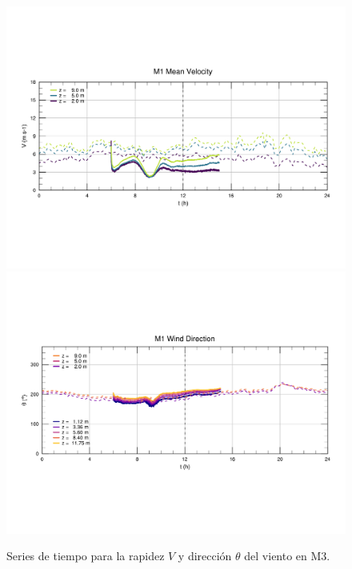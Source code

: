 \begin{figure}[H]
	\centering
	\includegraphics[width=0.87\linewidth,page=3,trim={9mm 57mm 10mm 60mm},clip]{Imagenes/06/bol/ts_interpol_compare.pdf}\\%
	\includegraphics[width=0.87\linewidth,page=3,trim={12mm 52mm 10mm 60mm},clip]{Imagenes/06/bol/ts_interpol_compare_o.pdf}%
	\vspace{-2mm}\caption{Series de tiempo para la rapidez $V$ y dirección $\theta$ del viento en M3.}
	\label{fig:06_bol_ts_m3}
\end{figure}

